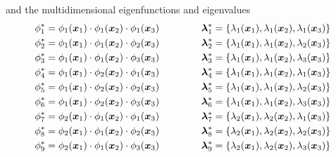 \documentclass[onecolumn,a4paper,11pt]{article}
\begin{document}
\noindent and the multidimensional eigenfunctions and eigenvalues
%
\begin{eqnarray}
\phi^{\ast}_1= \phi_{1}(\bm{x}_1) \cdot \phi_{1}(\bm{x}_2) \cdot \phi_{1}(\bm{x}_3) \hspace{1.5cm} \bm{\lambda}^{\ast}_1= \{\lambda_1(\bm{x}_1), \lambda_1(\bm{x}_2), \lambda_1(\bm{x}_3)\} \nonumber \\
%
\phi^{\ast}_2= \phi_{1}(\bm{x}_1) \cdot \phi_{1}(\bm{x}_2) \cdot \phi_{2}(\bm{x}_3) \hspace{1.5cm} \bm{\lambda}^{\ast}_2= \{\lambda_1(\bm{x}_1), \lambda_1(\bm{x}_2), \lambda_2(\bm{x}_3)\} \nonumber \\
%
\phi^{\ast}_3= \phi_{1}(\bm{x}_1) \cdot \phi_{1}(\bm{x}_2) \cdot \phi_{3}(\bm{x}_3) \hspace{1.5cm} \bm{\lambda}^{\ast}_3= \{\lambda_1(\bm{x}_1), \lambda_1(\bm{x}_2), \lambda_3(\bm{x}_3)\} \nonumber \\
%
\phi^{\ast}_4= \phi_{1}(\bm{x}_1) \cdot \phi_{2}(\bm{x}_2) \cdot \phi_{1}(\bm{x}_3) \hspace{1.5cm} \bm{\lambda}^{\ast}_4= \{\lambda_1(\bm{x}_1), \lambda_1(\bm{x}_2), \lambda_1(\bm{x}_3)\} \nonumber \\
%
\phi^{\ast}_5= \phi_{1}(\bm{x}_1) \cdot \phi_{2}(\bm{x}_2) \cdot \phi_{2}(\bm{x}_3) \hspace{1.5cm} \bm{\lambda}^{\ast}_5= \{\lambda_1(\bm{x}_1), \lambda_1(\bm{x}_2), \lambda_2(\bm{x}_3)\} \nonumber \\
%
\phi^{\ast}_6= \phi_{1}(\bm{x}_1) \cdot \phi_{2}(\bm{x}_2) \cdot \phi_{3}(\bm{x}_3) \hspace{1.5cm} \bm{\lambda}^{\ast}_6= \{\lambda_1(\bm{x}_1), \lambda_1(\bm{x}_2), \lambda_3(\bm{x}_3)\} \nonumber \\
%
\phi^{\ast}_7= \phi_{2}(\bm{x}_1) \cdot \phi_{1}(\bm{x}_2) \cdot \phi_{1}(\bm{x}_3) \hspace{1.5cm} \bm{\lambda}^{\ast}_7= \{\lambda_2(\bm{x}_1), \lambda_2(\bm{x}_2), \lambda_1(\bm{x}_3)\} \nonumber \\
%
\phi^{\ast}_8= \phi_{2}(\bm{x}_1) \cdot \phi_{1}(\bm{x}_2) \cdot \phi_{2}(\bm{x}_3) \hspace{1.5cm} \bm{\lambda}^{\ast}_8= \{\lambda_2(\bm{x}_1), \lambda_2(\bm{x}_2), \lambda_2(\bm{x}_3)\} \nonumber \\
%
\phi^{\ast}_9= \phi_{2}(\bm{x}_1) \cdot \phi_{1}(\bm{x}_2) \cdot \phi_{3}(\bm{x}_3) \hspace{1.5cm} \bm{\lambda}^{\ast}_9= \{\lambda_2(\bm{x}_1), \lambda_2(\bm{x}_2), \lambda_3(\bm{x}_3)\} \nonumber \\

\end{eqnarray}
\end{document}
